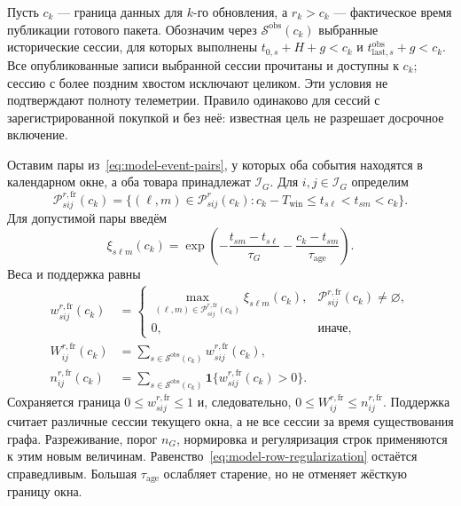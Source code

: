 \documentclass[12pt,a4paper]{article}
\newcommand{\ind}{\mathbf 1}
\theoremstyle{plainru}
\begin{document}
Пусть $c_k$ --- граница данных для $k$-го обновления,
а $r_k>c_k$ --- фактическое время публикации готового пакета.
Обозначим через $\mathcal S^{\mathrm{obs}}(c_k)$ выбранные исторические
сессии, для которых выполнены $t_{0,s}+H+g<c_k$ и
$t_{\mathrm{last},s}^{\mathrm{obs}}+g<c_k$.
Все опубликованные записи выбранной сессии прочитаны и доступны к $c_k$;
сессию с более поздним хвостом исключают целиком. Эти условия не подтверждают
полноту телеметрии. Правило одинаково для сессий с зарегистрированной покупкой
и без неё: известная цель не разрешает досрочное включение.

Оставим пары из~\eqref{eq:model-event-pairs}, у которых оба события
находятся в календарном окне, а оба товара принадлежат
$\mathcal I_G$. Для $i,j\in\mathcal I_G$ определим
\begin{equation}\label{eq:freshness-pairs}
\mathcal P^{r,\mathrm{fr}}_{sij}(c_k)
=\{(\ell,m)\in\mathcal P^r_{sij}(c_k):
c_k-T_{\mathrm{win}}\le t_{s\ell}<t_{sm}<c_k\}.
\end{equation}
Для допустимой пары введём
\begin{equation}\label{eq:freshness-pair-weight}
\xi_{s\ell m}(c_k)=
\exp\!\left(-\frac{t_{sm}-t_{s\ell}}{\tau_G}
            -\frac{c_k-t_{sm}}{\tau_{\mathrm{age}}}\right).
\end{equation}
Веса и поддержка равны
\begin{align}
w^{r,\mathrm{fr}}_{sij}(c_k)
&=
\begin{cases}
\displaystyle\max_{(\ell,m)\in\mathcal P^{r,\mathrm{fr}}_{sij}(c_k)}
\xi_{s\ell m}(c_k),
&\mathcal P^{r,\mathrm{fr}}_{sij}(c_k)\ne\varnothing,\\
0,&\text{иначе},
\end{cases}\label{eq:freshness-session}\\
W^{r,\mathrm{fr}}_{ij}(c_k)
&=\sum_{s\in\mathcal S^{\mathrm{obs}}(c_k)}
w^{r,\mathrm{fr}}_{sij}(c_k),\nonumber\\
n^{r,\mathrm{fr}}_{ij}(c_k)
&=\sum_{s\in\mathcal S^{\mathrm{obs}}(c_k)}
\ind\{w^{r,\mathrm{fr}}_{sij}(c_k)>0\}.
\label{eq:freshness-weight}
\end{align}
Сохраняется граница $0\le w^{r,\mathrm{fr}}_{sij}\le1$ и, следовательно,
$0\le W^{r,\mathrm{fr}}_{ij}\le n^{r,\mathrm{fr}}_{ij}$.
Поддержка считает различные сессии текущего окна, а не все сессии
за время существования графа. Разреживание, порог $n_G$,
нормировка и регуляризация строк применяются к этим новым величинам.
Равенство~\eqref{eq:model-row-regularization} остаётся справедливым.
Большая $\tau_{\mathrm{age}}$ ослабляет старение, но не отменяет
жёсткую границу окна.
\end{document}
